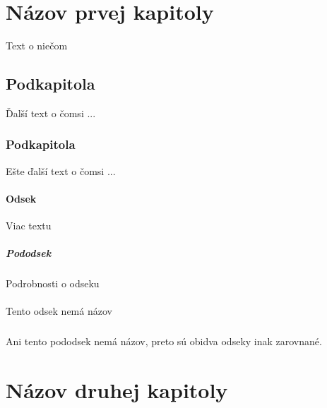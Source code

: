 \documentclass{article}
\title{\sktxt{Názov dokumentu}}
\date{29.1.2016}
\author{Andrej \sktxt{Šišila}}
\newcommand\sktxt[1]{\foreignlanguage{slovak}{#1}}
\begin{document}
\maketitle
{}
\newpage
{}

\section{Názov prvej kapitoly}
\sktxt{Text o niečom}

\subsection{Podkapitola}
\sktxt{Ďalší text o čomsi ...}

\subsubsection{Podkapitola}
\sktxt{Ešte ďalší text o čomsi ...}
	\paragraph{Odsek}
	\sktxt{Viac textu}
		\subparagraph{Pododsek}
		\sktxt{Podrobnosti o odseku}

	\paragraph{}
	\sktxt{Tento odsek nemá názov}
		\subparagraph{}
		\sktxt{Ani tento pododsek nemá názov, preto sú obidva odseky inak zarovnané.}

\newpage
\section{Názov druhej kapitoly}
\end{document}
